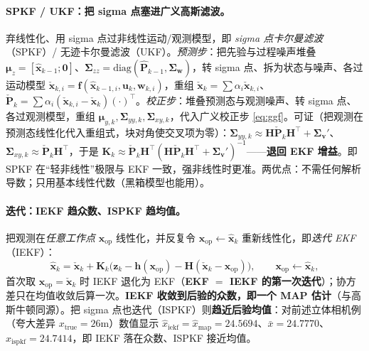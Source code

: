 \paragraph{SPKF / UKF：把 sigma 点塞进广义高斯滤波。}
弃线性化、用 sigma 点过非线性运动/观测模型，即 \emph{sigma 点卡尔曼滤波}（SPKF）/ 无迹卡尔曼滤波（UKF）\cite{barfoot2024state}。\emph{预测步}：把先验与过程噪声堆叠 $\boldsymbol{\mu}_z=[\hat{\mathbf{x}}_{k-1};\mathbf{0}]$、$\boldsymbol{\Sigma}_{zz}=\mathrm{diag}(\hat{\mathbf{P}}_{k-1},\boldsymbol{\Sigma}_{\mathbf{w}})$，转 sigma 点、拆为状态与噪声、各过运动模型 $\check{\mathbf{x}}_{k,i}=\mathbf{f}(\hat{\mathbf{x}}_{k-1,i},\mathbf{u}_k,\mathbf{w}_{k,i})$，重组 $\check{\mathbf{x}}_k=\sum\alpha_i\check{\mathbf{x}}_{k,i}$、$\check{\mathbf{P}}_k=\sum\alpha_i(\check{\mathbf{x}}_{k,i}-\check{\mathbf{x}}_k)(\cdot)^\top$。\emph{校正步}：堆叠预测态与观测噪声、转 sigma 点、各过观测模型，重组 $\boldsymbol{\mu}_{y,k},\boldsymbol{\Sigma}_{yy,k},\boldsymbol{\Sigma}_{xy,k}$，代入广义校正步 \cref{eq:ggf}。可证（把观测在预测态线性化代入重组式，块对角使交叉项为零）：$\boldsymbol{\Sigma}_{yy,k}\approx\mathbf{H}\check{\mathbf{P}}_k\mathbf{H}^\top+\boldsymbol{\Sigma}_{\mathbf{v}}'$、$\boldsymbol{\Sigma}_{xy,k}\approx\check{\mathbf{P}}_k\mathbf{H}^\top$，于是 $\mathbf{K}_k\approx\check{\mathbf{P}}_k\mathbf{H}^\top(\mathbf{H}\check{\mathbf{P}}_k\mathbf{H}^\top+\boldsymbol{\Sigma}_{\mathbf{v}}')^{-1}$——\textbf{退回 EKF 增益}。即 SPKF 在“轻非线性”极限与 EKF 一致，强非线性时更准。两优点：不需任何解析导数；只用基本线性代数（黑箱模型也能用）。

\paragraph{迭代：IEKF 趋众数、ISPKF 趋均值。}
把观测在\emph{任意工作点} $\mathbf{x}_{\text{op}}$ 线性化，并反复令 $\mathbf{x}_{\text{op}}\leftarrow\hat{\mathbf{x}}_k$ 重新线性化，即\emph{迭代 EKF}（IEKF）\cite{barfoot2024state}：
\begin{equation}
  \hat{\mathbf{x}}_k=\check{\mathbf{x}}_k+\mathbf{K}_k\big(\mathbf{z}_k-\mathbf{h}(\mathbf{x}_{\text{op}})-\mathbf{H}(\check{\mathbf{x}}_k-\mathbf{x}_{\text{op}})\big),\qquad
  \mathbf{x}_{\text{op}}\leftarrow\hat{\mathbf{x}}_k,
  \label{eq:iekf}
\end{equation}
首次取 $\mathbf{x}_{\text{op}}=\check{\mathbf{x}}_k$ 时 IEKF 退化为 EKF（\textbf{EKF $=$ IEKF 的第一次迭代}）；协方差只在均值收敛后算一次。\textbf{IEKF 收敛到后验的众数，即一个 MAP 估计}（与高斯牛顿同源）。把 sigma 点也迭代（ISPKF\cite{barfoot2024state}）则\textbf{趋近后验均值}：对前述立体相机例（夸大差异 $x_{\text{true}}=26$m）数值显示 $\hat{x}_{\text{iekf}}=\hat{x}_{\text{map}}=24.5694$、$\bar{x}=24.7770$、$\hat{x}_{\text{ispkf}}=24.7414$，即 IEKF 落在众数、ISPKF 接近均值。

